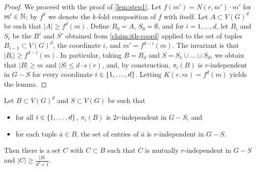 \begin{proof}
We proceed with the proof of \cref{lem:step1}.
Let $f(m')=N(r,m')\cdot m'$ for $m'\in\mathbb{N}$; by $f^k$ we denote the $k$-fold composition of $f$ with itself.
Let $A\subset V(G)^d$ be such that $|A|\ge f^d(m)$. 
Define $B_0=A$, $S_0=\emptyset$, and for $i=1,\ldots,d$,
let $B_{i}$ and $S_i$ be the $B'$ and $S'$ obtained from \cref{claim:ith-coord} applied to the set of tuples $B_{i-1}\subset V(G)^d$, the coordinate $i$, and $m'=f^{d-i}(m)$. 
The invariant is that $|B_i|\ge f^{d-i}(m)$.
In particular, 
taking $B=B_d$ and $S=S_1\cup\ldots \cup S_d$, we obtain that $|B|\ge m$ and $|S|\le d\cdot s(r)$, and, by construction, $\pi_i(B)$
is $r$-independent in $G-S$ for every coordinate $i\in\{1,\ldots,d\}$. Letting $K(r,m)=f^d(m)$ yields the lemma.
\end{proof}


\begin{lemma}\label{lem:step2}
	Let $B\subset V(G)^d$ and $S\subset V(G)$ be such that \begin{itemize}
	\item for all $i\in \{1,\ldots,d\}$,
	$\pi_i(B)$ is $2r$-independent in $G-S$, and 
	\item for each tuple $\bar a\in B$, the set of entries of $\bar a$ is $r$-independent in $G-S$.  
	\end{itemize}
	Then there is a set $C$ with $C\subset B$ 
	such that $C$ is mutually $r$-independent in $G-S$
	and $|C|\geq\frac{|B|}{d^2+1}$.
\end{lemma}
